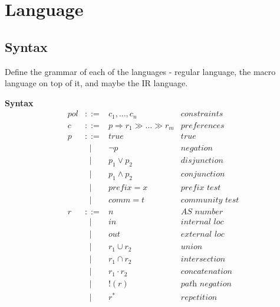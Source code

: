 \section{Language}
\label{sec:language}

\subsection{Syntax}
Define the grammar of each of the languages - regular language, the macro language on top of it, and maybe the IR language.

\newcommand{\BNFALT}{\;\;|\;\;}
\newcommand{\hdr}[2]{\flushleft \chdr{#1}{#2}}
\newcommand{\chdr}[2]{\textbf{#1} {#2} \\ \centering}

\begin{figure*}
  \begin{minipage}[t]{.42\linewidth}
  \hdr{\large Syntax}{}
  \vspace*{-1\baselineskip}
  \[ \begin{array}{rclr}
    \hline
     pol &::=& c_1, \dots, c_n & \textit{constraints} \\
     c   &::=& p \Rightarrow r_1 \gg \dots \gg r_m & \textit{preferences} \\
     p   &::=& true & \textit{true} \\
      &\BNFALT& \neg p & \textit{negation} \\
      &\BNFALT& p_1 \vee p_2 & \textit{disjunction} \\
      &\BNFALT& p_1 \wedge p_2 & \textit{conjunction} \\
      &\BNFALT& prefix = x & \textit{prefix test} \\
      &\BNFALT& comm = t & \textit{community test} \\
     r   &::=& n & \textit{AS number} \\
      &\BNFALT& in & \textit{internal loc} \\
      &\BNFALT& out & \textit{external loc} \\
      &\BNFALT& r_1 \cup r_2 & \textit{union} \\
      &\BNFALT& r_1 \cap r_2 & \textit{intersection} \\
      &\BNFALT& r_1 \cdot r_2 & \textit{concatenation} \\
      &\BNFALT& !(r) & \textit{path negation} \\
      &\BNFALT& r^* & \textit{repetition} \\
  \end{array} \]


\end{minipage}
\end{figure*}
